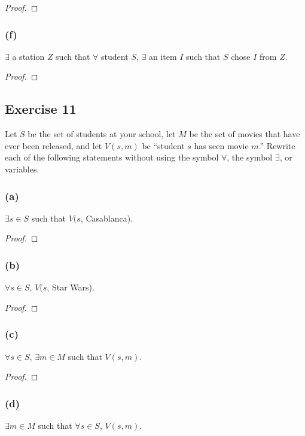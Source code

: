 \documentclass[14pt]{extarticle}
\newcommand{\fa}{\forall}
\newcommand{\te}{\exists}
\begin{document}
\begin{proof}

\end{proof}

\subsubsection{(f)}
$\te$ a station $Z$ such that $\fa$ student $S$, $\te$ an item $I$ such that $S$ chose $I$ from $Z$.

\begin{proof}

\end{proof}

\subsection{Exercise 11}
Let $S$ be the set of students at your school, let $M$ be the set of movies that have ever been released, and let $V(s, m)$ be “student $s$ has seen movie $m$.” Rewrite each of the following statements without using the symbol $\fa$, the symbol $\te$, or variables.

\subsubsection{(a)}
$\te s \in S$ such that $V(s$, Casablanca).

\begin{proof}

\end{proof}

\subsubsection{(b)}
$\fa s \in S$, $V(s$, Star Wars).

\begin{proof}

\end{proof}

\subsubsection{(c)}
$\fa s \in S$, $\te m \in M$ such that $V(s, m)$.

\begin{proof}

\end{proof}

\subsubsection{(d)}
$\te m \in M$ such that $\fa s \in S$, $V(s, m)$.
\end{document}
